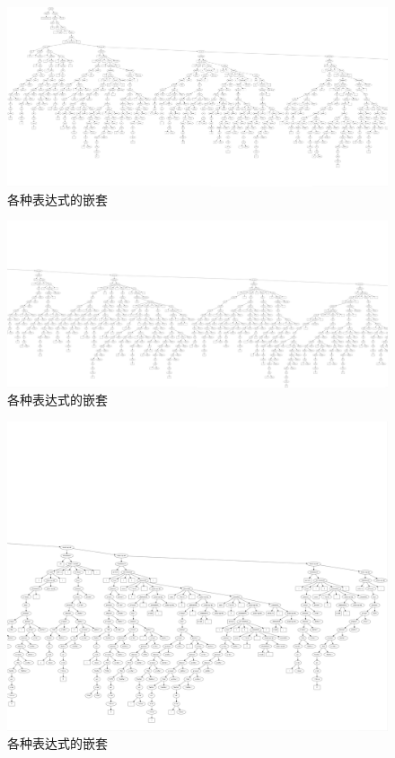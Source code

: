 \documentclass[supercite]{Experimental_Report}
\theoremstyle{definition}
\begin{document}
\begin{figure}[htb]
	\begin{center}
		\includegraphics[scale=0.1]{images/各种表达式的嵌套_1.png}
		\caption{各种表达式的嵌套}
		\label{fig3-4}
	\end{center}
\end{figure}
\newpage
\begin{figure}[htb]
	\begin{center}
		\includegraphics[scale=0.1]{images/各种表达式的嵌套_2.png}
		\caption{各种表达式的嵌套}
		\label{fig3-5}
	\end{center}
\end{figure}
\newpage
\begin{figure}[htb]
	\begin{center}
		\includegraphics[scale=0.2]{images/各种表达式的嵌套_3.png}
		\caption{各种表达式的嵌套}
		\label{fig3-6}
	\end{center}
\end{figure}
\end{document}
